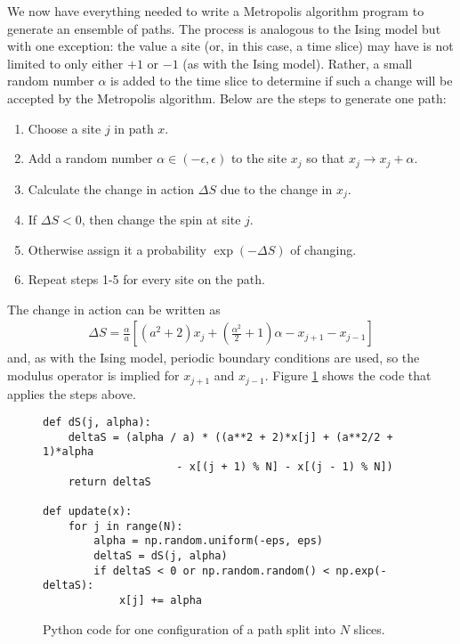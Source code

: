 \documentclass[11pt]{article}
\begin{document}
We now have everything needed to write a Metropolis algorithm program to generate an ensemble of paths. The process is analogous to the Ising model but with one exception: the value a site (or, in this case, a time slice) may have is not limited to only either $+1$ or $-1$ (as with the Ising model). Rather, a small random number $\alpha$ is added to the time slice to determine if such a change will be accepted by the Metropolis algorithm. Below are the steps to generate one path:
\begin{enumerate}
\item Choose a site $j$ in path $x$.
\item Add a random number $\alpha\in(-\epsilon,\epsilon)$ to the site $x_j$ so that $x_j\to x_j+\alpha$.
\item Calculate the change in action $\Delta S$ due to the change in $x_j$.
\item If $\Delta S<0$, then change the spin at site $j$.
\item Otherwise assign it a probability $\exp(-\Delta S)$ of changing.
\item Repeat steps 1-5 for every site on the path.
\end{enumerate}
The change in action can be written as
\begin{align}
	\Delta S= \frac{\alpha}{a}\left[(a^2+2)x_j+\left(\frac{\alpha^2}{2}+1\right)\alpha-x_{j+1}-x_{j-1}\right]
\end{align}
and, as with the Ising model, periodic boundary conditions are used, so the modulus operator is implied for $x_{j+1}$ and $x_{j-1}$. Figure \ref{fig:PathCode} shows the code that applies the steps above.
\begin{figure}[h]
\begin{lstlisting}
def dS(j, alpha):
    deltaS = (alpha / a) * ((a**2 + 2)*x[j] + (a**2/2 + 1)*alpha
    				 - x[(j + 1) % N] - x[(j - 1) % N])
    return deltaS

def update(x):
    for j in range(N):
        alpha = np.random.uniform(-eps, eps)
        deltaS = dS(j, alpha)        
        if deltaS < 0 or np.random.random() < np.exp(-deltaS):    
            x[j] += alpha
\end{lstlisting}
    \caption{Python code for one configuration of a path split into $N$ slices.}
\label{fig:PathCode}
\end{figure}
\end{document}
